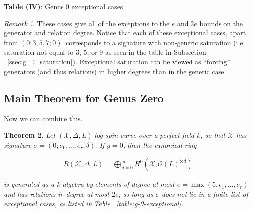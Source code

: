\documentclass{amsart}
\theoremstyle{plain}
\newtheorem{thm}{Theorem}[section]
\theoremstyle{definition}
\theoremstyle{remark}
\newtheorem{rem}[thm]{Remark}
\numberwithin{equation}{section}
\newcommand\ssec{\subsection}
\newcommand \sx{\mathscr X}
\newcommand\sco{{\mathscr O}}
\newcommand \halfcan{L}
\begin{document}
\begin{center}
\label{table:g-0-exceptional}
\textbf{Table (IV)}: Genus 0 exceptional cases
\end{center}

\begin{rem}
These cases give all of the exceptions to the $e$ and $2e$ bounds on
the generator and relation degree. Notice that each of these
exceptional cases, apart from $(0; 3, 5, 7; 0)$, corresponds to a
signature with non-generic saturation (i.e. saturation not equal to
3, 5, or 9 as seen in the table in Subsection
~\ref{ssec:g_0_saturation}). Exceptional saturation can be viewed as
``forcing'' generators (and thus relations) in higher degrees than
in the generic case.
\end{rem}

\ssec{Main Theorem for Genus Zero}
\label{ssec:g_0_main}
Now we can combine this.

\begin{thm}
\label{thm:g_0_generators_relations}
Let $(\sx, \Delta, \halfcan)$ log spin curve over a perfect field $k$,
so that $\sx$ has signature $\sigma = (0; e_1, \ldots, e_r; \delta)$.
If $g = 0$, then the canonical ring

\begin{align*}
	R(\sx, \Delta, \halfcan) = \bigoplus_{d = 0}^\infty H^0(\sx, \sco(L)^{\otimes d})
\end{align*}

\noindent
is generated as a $k$-algebra by elements of degree at most $e =
\max(5, e_1, \ldots, e_r)$ and has relations in degree at most $2e$,
so long as $\sigma$ does not lie in a finite list of exceptional
cases, as listed in Table ~\ref{table:g-0-exceptional}.
\end{thm}
\end{document}
